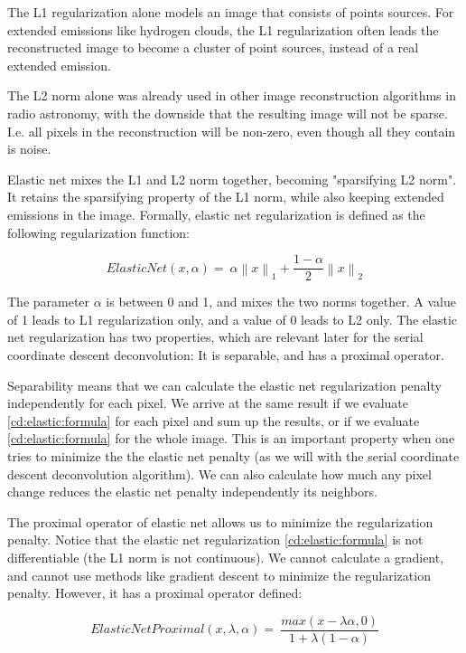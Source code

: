 The L1 regularization alone models an image that consists of points sources. For extended emissions like hydrogen clouds, the L1 regularization often leads the reconstructed image to become a cluster of point sources, instead of a real extended emission.

The L2 norm alone was already used in other image reconstruction algorithms in radio astronomy\cite{ferrari2014distributed}, with the downside that the resulting image will not be sparse. I.e. all pixels in the reconstruction will be non-zero, even though all they contain is noise. 

Elastic net mixes the L1 and L2 norm together, becoming "sparsifying L2 norm". It retains the sparsifying property of the L1 norm, while also keeping extended emissions in the image. Formally, elastic net regularization is defined as the following regularization function:

\begin{equation}\label{cd:elastic:formula}
ElasticNet(x, \alpha) = \: \alpha \left \|x \right \|_1 + \frac{1-\alpha}{2}  \left \|x \right \|_2
\end{equation}

The parameter $\alpha$ is between 0 and 1, and mixes the two norms together. A value of 1 leads to L1 regularization only, and a value of 0 leads to L2 only. The elastic net regularization has two properties, which are relevant later for the serial coordinate descent deconvolution: It is separable, and has a proximal operator.

Separability means that we can calculate the elastic net regularization penalty independently for each pixel. We arrive at the same result if we evaluate \eqref{cd:elastic:formula} for each pixel and sum up the results, or if we evaluate \eqref{cd:elastic:formula} for the whole image. This is an important property when one tries to minimize the the elastic net penalty (as we will with the serial coordinate descent deconvolution algorithm). We can also calculate how much any pixel change reduces the elastic net penalty independently its neighbors.

The proximal operator of elastic net allows us to minimize the regularization penalty. Notice that the elastic net regularization \eqref{cd:elastic:formula} is not differentiable (the L1 norm is not continuous). We cannot calculate a gradient, and cannot use methods like gradient descent to minimize the regularization penalty. However, it has a proximal operator defined:

\begin{equation}\label{cd:elastic:proximal}
ElasticNetProximal(x, \lambda ,\alpha) = \: \frac{max(x - \lambda \alpha, 0)}{1+\lambda(1 - \alpha)}
\end{equation}

